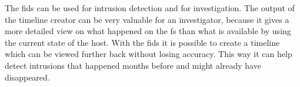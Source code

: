 The \gls{fids} can be used for \gls{intrusion} detection and for investigation. The output of the timeline creator can be very valuable for an investigator, because it gives a more detailed view on what happened on the \gls{fs} than what is available by using the current state of the host. With the \gls{fids} it is possible to create a timeline which can be viewed further back without losing accuracy. This way it can help detect intrusions that happened months before and might already have disappeared.
